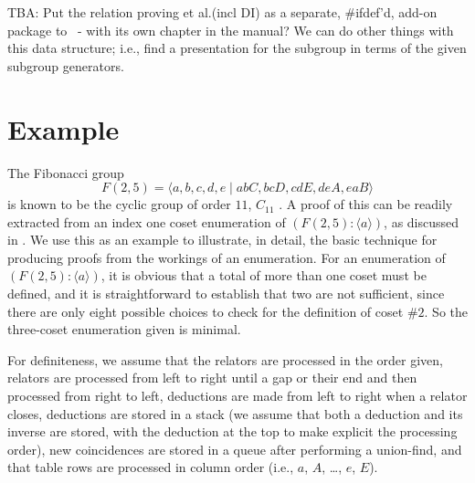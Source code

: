 


TBA:
Put the relation proving et al.\@ (incl DI) as a separate, \#ifdef'd,
  add-on package to \ace\ - with its own chapter in the manual?
We can do other things with this data structure; i.e., find a presentation
  for the subgroup in terms of the given subgroup generators.

\section{Example}

The Fibonacci group 
 $$ F(2,5) = \langle a,b,c,d,e \mid abC, bcD, cdE, deA, eaB \rangle $$
  is known to be the cyclic group of order $11$, $C_{11}$ \cite{Con65}.
A proof of this can be readily extracted from an index one coset 
  enumeration of $(F(2,5) : \langle a \rangle)$, as discussed in \cite{Lee77}.
We use this as an example to illustrate, in detail, the basic technique for
  producing proofs from the workings of an enumeration.
%
For an enumeration of $(F(2,5) : \langle a \rangle)$, it is obvious that a
  total of more than one coset must be defined, and it is straightforward
  to establish that two are not sufficient, since there are only eight
  possible choices to check for the definition of coset \#$2$.
So the three-coset enumeration given is minimal.

For definiteness, we assume that the relators are processed in the order
  given, relators are processed from left to right until a gap or their
  end and then processed from right to left, deductions are made from left
  to right when a relator closes, deductions are stored in a stack (we 
  assume that both a deduction and its inverse are stored, with the 
  deduction at the top to make explicit the processing order), new
  coincidences are stored in a queue after performing a union-find, and
  that table rows are processed in column order (i.e., 
  $a$, $A$, \dots, $e$, $E$).

